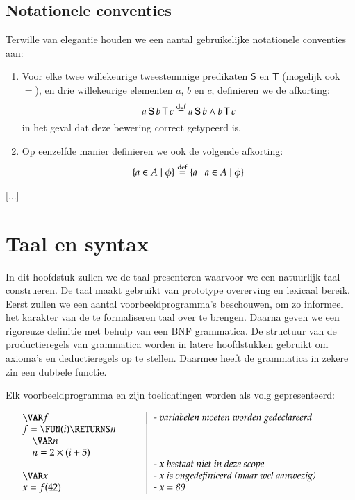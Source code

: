 \documentclass[11pt,oneside,parskip=half]{scrbook}
\makeatletter
\def\IN{\quad}
\newcommand{\<}
  {\ensuremath{\langle}}
\renewcommand{\>}
  {\ensuremath{\rangle}}
\newenvironment{SyntaxExample}{%
\vspace{-1.6pc}%
	\begin{equation*}%
		\begin{array}{l@{\hspace*{.02\textwidth}}|@{\hspace*{.02\textwidth}}l}%
		\hspace*{.35\textwidth} & \hspace*{.55\textwidth} \\[-1pc]%
}{%
		\end{array}%
	\end{equation*}%
\vspace{-.6pc}%
}
\makeatother
\begin{document}
\section{Notationele conventies}

Terwille van elegantie houden we een aantal gebruikelijke notationele conventies aan:

\begin{enumerate}
	\item Voor elke twee willekeurige tweestemmige predikaten $\mathsf{S}$ en $\mathsf{T}$ (mogelijk ook $=$), en drie willekeurige elementen $a$, $b$ en $c$, definieren we de afkorting: $$a \operatorname{\mathsf{S}} b \operatorname{\mathsf{T}} c \buildrel{\mathrm{def}}\over{=} a \operatorname{\mathsf{S}} b \land b \operatorname{\mathsf{T}} c$$ in het geval dat deze bewering correct getypeerd is.
	\item Op eenzelfde manier definieren we ook de volgende afkorting: $$ \{a \in A \mid \phi \} \buildrel{\mathrm{def}}\over{=} \{a \mid a \in A \mid \phi\}$$
\end{enumerate}

[...]

\chapter{Taal en syntax}

In dit hoofdstuk zullen we de taal presenteren waarvoor we een natuurlijk taal construeren. De taal maakt gebruikt van prototype overerving en lexicaal bereik. Eerst zullen we een aantal voorbeeldprogramma's beschouwen, om zo informeel het karakter van de te formaliseren taal over te brengen. Daarna geven we een rigoreuze definitie met behulp van een BNF grammatica. De structuur van de productieregels van grammatica worden in latere hoofdstukken gebruikt om axioma's en deductieregels op te stellen. Daarmee heeft de grammatica in zekere zin een dubbele functie.

Elk voorbeeldprogramma en zijn toelichtingen worden als volg gepresenteerd:

	\begin{SyntaxExample}
		\VAR f & \textit{- variabelen moeten worden gedeclareerd} \\
		f = \FUN(i) \RETURNS n \\
		\IN \VAR n \\
		\IN n = 2 \times (i + 5) \\
		& \textit{- x bestaat niet in deze scope} \\
		\VAR x & \textit{- x is ongedefinieerd (maar wel aanwezig)} \\
		x = f(42) & \textit{- x = 89}
	\end{SyntaxExample}
\end{document}
